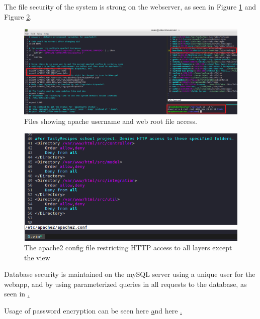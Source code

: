 \documentclass[a4paper]{scrreprt}
\begin{document}
The file security of the system is strong on the webserver, as seen in Figure \ref{fig:ownership} and Figure \ref{fig:reqaccess}.

\begin{figure}[h!]
  \begin{center}
    \includegraphics[scale=0.41]{img/filesecurity_ownership.png}
    \caption{Files showing apache username and web root file access.}
    \label{fig:ownership}
  \end{center}
\end{figure}

\begin{figure}[h!]
  \begin{center}
    \includegraphics[scale=0.41]{img/filesecurity_reqaccess.png}
    \caption{The apache2 config file restricting HTTP access to all layers except the view}
    \label{fig:reqaccess}
  \end{center}
\end{figure}

Database security is maintained on the mySQL server using a unique user for the webapp, and by using parameterized queries in all requests to the database, as seen in \href{https://github.com/fongie/TastyRecipes/blob/assignment3/src/integration/DatabaseRequest.php}.

Usage of password encryption can be seen here \href{https://github.com/fongie/TastyRecipes/blob/86f4548c3b4659b762134c756cc5ac4c0cbf72a2/src/model/UserAccountHandler.php#L35} and here \href{https://github.com/fongie/TastyRecipes/blob/86f4548c3b4659b762134c756cc5ac4c0cbf72a2/src/model/UserAccountHandler.php#L18}.
\end{document}
